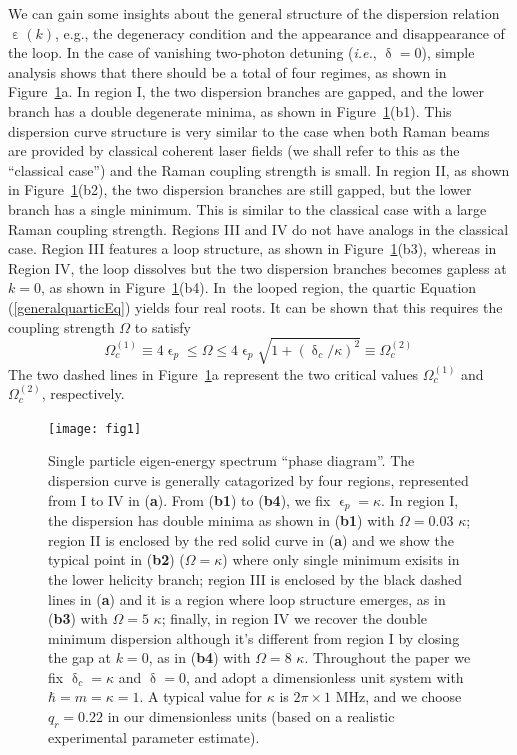 \documentclass[atoms,article,accept,moreauthors,pdftex,12pt,a4paper]{mdpi}
\begin{document}
We can gain some insights about the general structure of the dispersion relation $\upepsilon(k)$, e.g., the degeneracy condition and the appearance and disappearance of the loop. In the case of vanishing two-photon detuning (\emph{i.e.}, $\updelta=0$),
simple analysis shows that there should be a total of four regimes, as shown in Figure~\ref{fig1}a. In region I, the two dispersion branches are gapped, and the lower branch has a double degenerate minima, as shown in Figure~\ref{fig1}(b1). This dispersion curve structure is very similar to the case when both Raman beams are provided by classical coherent laser fields (we shall refer to this as the ``classical case'') and the Raman coupling strength is small. In region II, as shown in Figure~\ref{fig1}(b2), the two dispersion branches are still gapped, but the lower branch has a single minimum. This is similar to the classical case with a large Raman coupling strength. Regions III and IV do not have analogs in the classical case. Region III features a loop structure, as shown in Figure~\ref{fig1}(b3), whereas in Region IV, the loop dissolves but the two dispersion branches becomes gapless at $k=0$, as shown in Figure~\ref{fig1}(b4). In~the looped region, the quartic Equation (\ref{generalquarticEq}) yields four real roots. It can be shown \cite{cavitySOC} that this requires the coupling strength $\Omega$ to satisfy
\[\Omega_c^{(1)}\equiv4\upvarepsilon_p\leq \Omega \leq  4\upvarepsilon_p \sqrt{1+(\updelta_c/\kappa)^2}\equiv\Omega_c^{(2)} \,\]
The two dashed lines in Figure~\ref{fig1}a represent the two critical values $\Omega_c^{(1)}$ and $\Omega_c^{(2)}$, respectively.

\begin{figure}[H]
\centering
\texttt{[image: fig1]}  \vspace{12pt}
\caption{Single particle eigen-energy spectrum ``phase diagram''.  The dispersion curve is generally catagorized by four regions, represented from I to IV in (\textbf{a}). From (\textbf{b1}) to (\textbf{b4}), we fix $\upvarepsilon_p=\kappa$. In region I, the dispersion has double minima as shown in (\textbf{b1}) with $\Omega=0.03$ $\kappa$; region II is enclosed by the red solid curve in (\textbf{a}) and we show the typical point in (\textbf{b2})  ($\Omega=\kappa$) where only single minimum exisits in the lower helicity branch; region III is enclosed by the black dashed lines in (\textbf{a}) and it is a region where loop structure emerges, as in (\textbf{b3}) with $\Omega=5$ $\kappa$; finally, in region IV we recover the double minimum dispersion although it's different from region I by closing the gap at $k=0$, as in (\textbf{b4}) with $\Omega=8$ $\kappa$. Throughout the paper we fix $\updelta_c=\kappa$ and $\updelta=0$, and adopt a dimensionless unit system with $\hbar=m=\kappa=1$. A typical value for $\kappa$ is $2\pi \times 1 \text{ MHz}$, and we choose $q_r = 0.22$ in our dimensionless units (based on a realistic experimental parameter estimate). }\label{fig1}
\end{figure}
\end{document}
